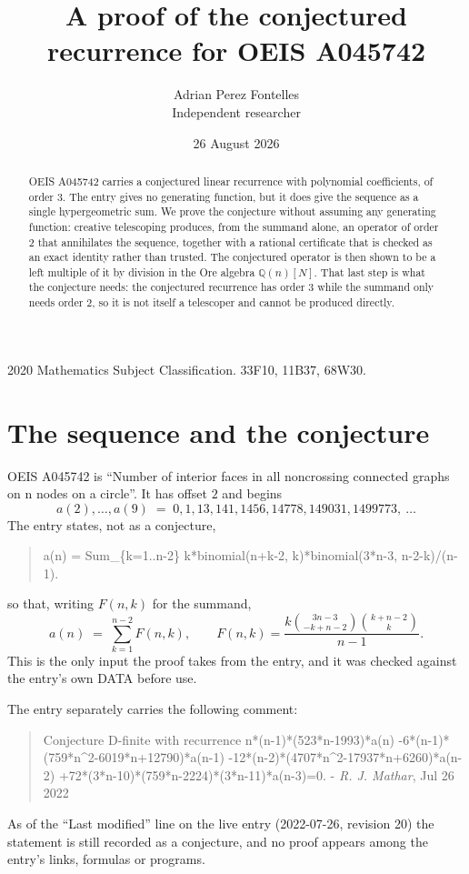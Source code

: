 \documentclass[11pt,a4paper]{article}
\title{A proof of the conjectured recurrence for OEIS A045742}
\author{Adrian Perez Fontelles\\ \small Independent researcher}
\date{26 August 2026}
\theoremstyle{plain}
\theoremstyle{definition}
\begin{document}
\maketitle

\begin{abstract}
OEIS A045742 carries a conjectured linear recurrence with polynomial coefficients, of
order 3. The entry gives no generating function, but it does give the sequence as
a single hypergeometric sum. We prove the conjecture without assuming any generating
function: creative telescoping produces, from the summand alone, an operator of order
2 that annihilates the sequence, together with a rational certificate that is
checked as an exact identity rather than trusted. The conjectured operator is then shown
to be a left multiple of it by division in the Ore algebra $\mathbb{Q}(n)[N]$. That last
step is what the conjecture needs: the conjectured recurrence has order $3$ while the summand only needs order $2$, so it is not itself a telescoper and cannot be produced directly.
\end{abstract}

\noindent\small 2020 Mathematics Subject Classification. 33F10, 11B37, 68W30.\normalsize

\section{The sequence and the conjecture}

OEIS A045742 is ``Number of interior faces in all noncrossing connected graphs on n nodes on a circle''. It has offset $2$ and begins
\[
a(2),\dots,a(9)\;=\;0, 1, 13, 141, 1456, 14778, 149031, 1499773,\ \dots
\]
The entry states, not as a conjecture,
\begin{quote}\small
a(n) = Sum\_\{k=1..n-2\} k*binomial(n+k-2, k)*binomial(3*n-3, n-2-k)/(n-1).
\end{quote}
so that, writing $F(n,k)$ for the summand,
\begin{equation}\label{eq:sum}
a(n)\;=\;\sum_{k=1}^{n - 2}F(n,k),
\qquad F(n,k)=\frac{k {\binom{3 n - 3}{- k + n - 2}} {\binom{k + n - 2}{k}}}{n - 1} .
\end{equation}
This is the only input the proof takes from the entry, and it was checked against the
entry's own DATA before use.

The entry separately carries the following comment:
\begin{quote}\small
Conjecture D-finite with recurrence n*(n-1)*(523*n-1993)*a(n) -6*(n-1)*(759*n\^{}2-6019*n+12790)*a(n-1) -12*(n-2)*(4707*n\^{}2-17937*n+6260)*a(n-2) +72*(3*n-10)*(759*n-2224)*(3*n-11)*a(n-3)=0. - \emph{R. J. Mathar}, Jul 26 2022
\end{quote}
As of the ``Last modified'' line on the live entry (2022-07-26, revision 20) the
statement is still recorded as a conjecture, and no proof appears among the entry's links,
formulas or programs.
\end{document}

